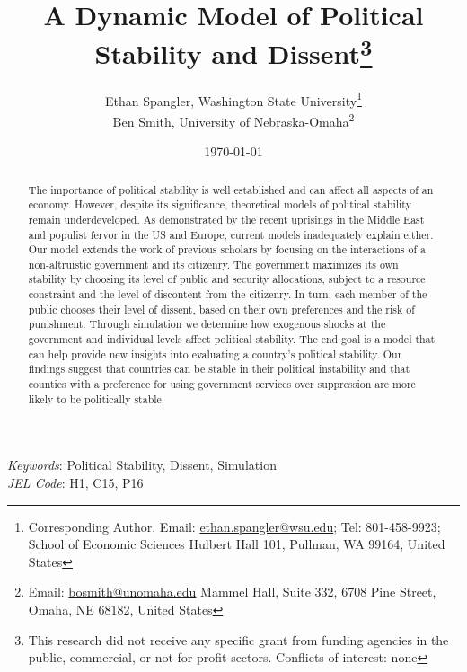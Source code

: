 \documentclass[12pt]{article}
\begin{document}
  


\begin{titlepage}





\title{A Dynamic Model of Political Stability and Dissent\thanks{This research did not receive any specific grant from funding agencies in the public, commercial, or not-for-profit sectors. Conflicts of interest: none}}

\author{Ethan Spangler, Washington State University\thanks{Corresponding Author. Email: {\href{mailto:ethan.spangler@wsu.edu}{ethan.spangler@wsu.edu}}; Tel: 801-458-9923; School of Economic Sciences Hulbert Hall 101, Pullman, WA 99164, United States}  \\
Ben Smith, University of Nebraska-Omaha\thanks{Email: {\href{mailto:bosmith@unomaha.edu}{bosmith@unomaha.edu}} Mammel Hall, Suite 332, 6708 Pine Street, Omaha, NE 68182, United States}}













\date{\today}
\maketitle


\begin{abstract}
\noindent The importance of political stability is well established and can affect all aspects of an economy. However, despite its significance, theoretical models of political stability remain underdeveloped. As demonstrated by the recent uprisings in the Middle East and populist fervor in the US and Europe, current models inadequately explain either. Our model extends the work of previous scholars by focusing on the interactions of a non-altruistic government and its citizenry. The government maximizes its own stability by choosing its level of public and security allocations, subject to a resource constraint and the level of discontent from the citizenry. In turn, each member of the public chooses their level of dissent, based on their own preferences and the risk of punishment. Through simulation we determine how exogenous shocks at the government and individual levels affect political stability. The end goal is a model that can help provide new insights into evaluating a country's political stability. Our findings suggest that countries can be stable in their political instability and that counties with a preference for using government services over suppression are more likely to be politically stable.      


\end{abstract}

\noindent \textit{Keywords}: Political Stability, Dissent, Simulation \\

\noindent \textit{JEL Code}: H1, C15, P16


\end{titlepage}
\end{document}
